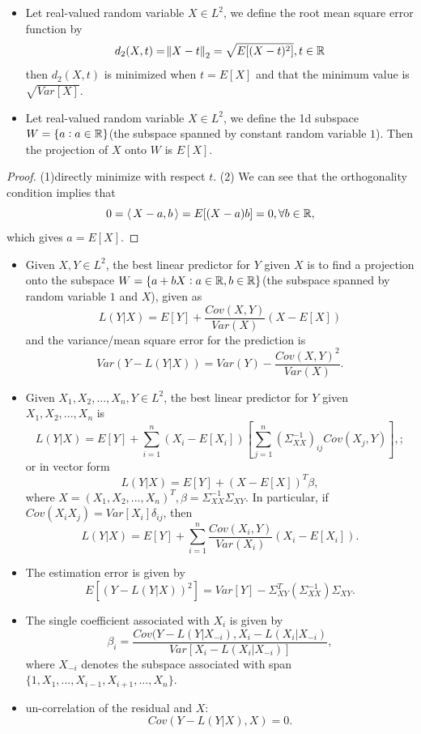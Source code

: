 \begin{refsection}
\begin{lemma}\hfill
\begin{itemize}
	\item Let real-valued random variable $X\in L^2$, we define the root mean square error function by
	$$d_2(X,t) = \norm{X-t}_2 = \sqrt{E[(X-t)^2]},t\in \mathbb{R}$$
	then $d_2(X,t)$ is minimized when $t=E[X]$ and that the minimum value is $\sqrt{Var[X]}$.
	\item 	Let real-valued random variable $X\in L^2$, we define the 1d subspace $W=\{a:a\in \mathbb{R}\}$(the subspace spanned by constant random variable $1$). Then the projection of $X$ onto $W$ is $E[X].$
\end{itemize}		
\end{lemma}
\begin{proof}
(1)directly minimize with respect $t$.	
(2) We can see that the orthogonality condition implies that $$0={\left< \, X-a,b \, \right>} = E[(X-a)b] = 0, \forall b\in \mathbb{R},$$
which gives $a = E[X]$.
\end{proof}


\begin{theorem}\label{ch:theory-of-probability:th:BestLinearPredictorForRandomVariables}\hfill
\begin{itemize}
	\item Given $X,Y\in L^2$, the best linear predictor for $Y$ given $X$ is to find a projection onto the subspace $W=\{a+bX:a\in \mathbb{R}, b\in \mathbb{R}\}$(the subspace spanned by random variable $1$ and $X$), given as
	$$L(Y|X) = E[Y] + \frac{Cov(X,Y)}{Var(X)}(X-E[X])$$
	and the variance/mean square error for the prediction is
	$$Var(Y-L(Y|X)) = Var(Y) - \frac{Cov(X,Y)^2}{Var(X)}.$$
	\item Given $X_1,X_2,...,X_n,Y\in L^2$, the best linear predictor for $Y$ given $X_1,X_2,...,X_n$ is
	$$L(Y|X) = E[Y] + \sum_{i=1}^n (X_i - E[X_i]) [\sum_{j=1}^n(\Sigma_{XX}^{-1})_{ij}Cov(X_j,Y)],;$$
	or in vector form
	$$L(Y|X) = E[Y] + (X-E[X])^T\beta,$$
	where $X = (X_1,X_2,...,X_n)^T, \beta = \Sigma_{XX}^{-1}\Sigma_{XY}$.
	In particular, if $Cov(X_iX_j) = Var[X_i]\delta_{ij}$, then
	$$L(Y|X) = E[Y] + \sum_{i=1}^n \frac{Cov(X_i,Y)}{Var(X_i)}(X_i-E[X_i]) .$$
	\item The estimation error is given by
	$$E[(Y - L(Y|X))^2] = Var[Y] - \Sigma_{XY}^T(\Sigma_{XX}^{-1})\Sigma_{XY}.$$
	\item The single coefficient associated with $X_i$ is given by
	$$\beta_i = \frac{Cov(Y - L(Y|X_{-i}),X_i - L(X_i|X_{-i})}{Var[X_i - L(X_i|X_{-i})]},$$
	where $X_{-i}$ denotes the subspace associated with span $\{1,X_1, ..., X_{i-1},X_{i+1},...,X_n\}$.
	\item un-correlation  of the residual and $X$:
	$$Cov(Y-L(Y|X),X) = 0.$$
	

\end{itemize}
\end{theorem}
\end{refsection}
